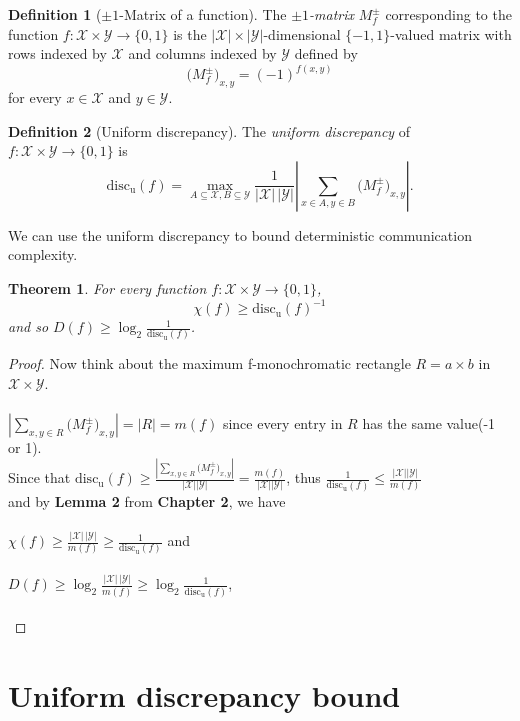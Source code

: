 \documentclass[11pt,oneside]{book}
\theoremstyle{plain}
\newtheorem{theorem}{Theorem}
\theoremstyle{definition}
\newtheorem{definition}{Definition}
\theoremstyle{plain}
\newcommand{\calX}{\mathcal{X}}
\newcommand{\calY}{\mathcal{Y}}
\newcommand{\discu}{\mathrm{disc_u}}
\begin{document}
\begin{definition}[$\pm 1$-Matrix of a function]
	The \emph{$\pm 1$-matrix} $M^\pm_f$ corresponding to the function $f : \calX \times \calY \to \{0,1\}$ is the $|\calX| \times |\calY|$-dimensional $\{-1,1\}$-valued matrix with rows indexed by $\calX$ and columns indexed by $\calY$ defined by
	\[
	\big(M^{\pm}_f\big)_{x,y} = (-1)^{f(x,y)}
	\]
	for every $x \in \calX$ and $y \in \calY$.
\end{definition}

\begin{definition}[Uniform discrepancy]
	The \emph{uniform discrepancy} of $f : \calX \times \calY \to \{0,1\}$ is
	\[
	\discu(f) = \max_{A \subseteq \calX, B \subseteq \calY} \frac{1}{|\calX| \, |\calY|} \left| \sum_{x \in A, y \in B} \big(M^{\pm}_f\big)_{x,y} \right|.
	\]
\end{definition}

We can use the uniform discrepancy to bound deterministic communication complexity.

\begin{theorem}
	For every function $f : \calX \times \calY \to \{0,1\}$,
	\[
	\chi(f) \ge \discu(f)^{-1}
	\] 
	and so $D(f) \ge \log_2 \frac1{\discu(f)}$.
\end{theorem}

\begin{proof}
	Now think about the maximum f-monochromatic rectangle $R = a \times b$ in $\calX \times \calY$. \\
	\\
	$\left|\sum_{x,y \in R} \big(M^{\pm}_f\big)_{x,y}\right| = \left|R\right| = m(f)$ since every entry in $R$ has the same value(-1 or 1). \\
	Since that $\discu(f) \ge \frac{\left|\sum_{x,y \in R} \big(M^{\pm}_f\big)_{x,y}\right|}{|\calX| |\calY|} = \frac{m(f)}{|\calX| |\calY|}$, thus $\frac{1}{\discu(f)} \leq \frac{|\calX||\calY|}{m(f)}$  \\
	and by \textbf{Lemma 2} from \textbf{Chapter 2}, we have \\
	\\
	$\chi(f) \ge \frac{|\calX| \, |\calY|}{m(f)} \ge \frac{1}{\discu(f)}$ and \\
	\\
	$D(f) \ge \log_2 \frac{|\calX| \, |\calY|}{m(f)} \ge \log_2 \frac{1}{\discu(f)}$, \\
	\\ 
\end{proof}


 \section{Uniform discrepancy bound}
\end{document}
